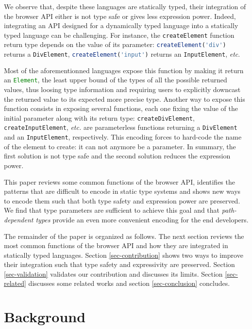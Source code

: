 \documentclass{llncs}
\newcommand{\jscode}[1]{\lstinline[language=JavaScript]|#1|}
\begin{document}
We observe that, despite these languages are statically typed, their integration of the browser API either is not type safe or gives less expression power. Indeed, integrating an API designed for a dynamically typed language into a statically typed language can be challenging. For instance, the \jscode{createElement} function return type depends on the value of its parameter: \jscode{createElement('div')} returns a \jscode{DivElement}, \jscode{createElement('input')} returns an \jscode{InputElement}, \emph{etc}.

Most of the aforementionned languages expose this function by making it return an \jscode{Element}, the least upper bound of the types of all the possible returned values, thus loosing type information and requiring users to explicitly downcast the returned value to its expected more precise type. Another way to expose this function consists in exposing several functions, each one fixing the value of the initial parameter along with its return type: \jscode{createDivElement}, \jscode{createInputElement}, \emph{etc.} are parameterless functions returning a \jscode{DivElement} and an \jscode{InputElement}, respectively. This encoding forces to hard-code the name of the element to create: it can not anymore be a parameter. In summary, the first solution is not type safe and the second solution reduces the expression power.

This paper reviews some common functions of the browser API, identifies the patterns that are difficult to encode in static type systems and shows new ways to encode them such that both type safety and expression power are preserved. We find that type parameters are sufficient to achieve this goal and that \emph{path-dependent types} provide an even more convenient encoding for the end developers.

The remainder of the paper is organized as follows. The next section reviews the most common functions of the browser API and how they are integrated in statically typed languages. Section \ref{sec-contribution} shows two ways to improve their integration such that type safety and expressivity are preserved. Section \ref{sec-validation} validates our contribution and discusses its limits. Section \ref{sec-related} discusses some related works and section \ref{sec-conclusion} concludes.

\section{Background}
\label{sec-background}
\end{document}

